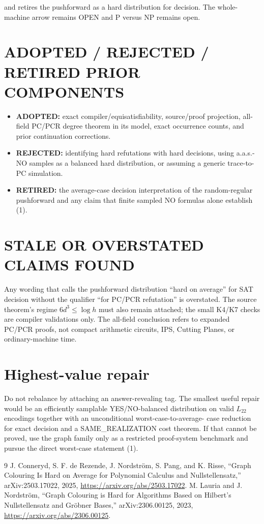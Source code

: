 \documentclass[11pt]{article}
\newcommand{\Ltwo}{L_{22}}
\begin{document}
and retires the pushforward as a hard distribution for decision.  The
whole-machine arrow remains OPEN and P versus NP remains open.

\section{ADOPTED / REJECTED / RETIRED PRIOR COMPONENTS}
\begin{itemize}
\item \textbf{ADOPTED:} exact compiler/equisatisfiability, source/proof
projection, all-field PC/PCR degree theorem in its model, exact occurrence
counts, and prior continuation corrections.
\item \textbf{REJECTED:} identifying hard refutations with hard decisions,
using a.a.s.-NO samples as a balanced hard distribution, or assuming a generic
trace-to-PC simulation.
\item \textbf{RETIRED:} the average-case decision interpretation of the
random-regular pushforward and any claim that finite sampled NO formulas alone
establish (1).
\end{itemize}

\section{STALE OR OVERSTATED CLAIMS FOUND}
Any wording that calls the pushforward distribution ``hard on average'' for
SAT decision without the qualifier ``for PC/PCR refutation'' is overstated.
The source theorem's regime \(6d^3\le\log h\) must also remain attached; the
small K4/K7 checks are compiler validations only.  The all-field conclusion
refers to expanded PC/PCR proofs, not compact arithmetic circuits, IPS,
Cutting Planes, or ordinary-machine time.

\section{Highest-value repair}
Do not rebalance by attaching an answer-revealing tag.  The smallest useful
repair would be an efficiently samplable YES/NO-balanced distribution on
valid \(\Ltwo\) encodings together with an unconditional worst-case-to-average-
case reduction for exact decision and a SAME\_REALIZATION cost theorem.  If
that cannot be proved, use the graph family only as a restricted proof-system
benchmark and pursue the direct worst-case statement (1).

\begin{thebibliography}{9}
J. Conneryd, S. F. de Rezende, J. Nordstr\"om, S. Pang, and K. Risse,
``Graph Colouring Is Hard on Average for Polynomial Calculus and
Nullstellensatz,'' arXiv:2503.17022, 2025,
\url{https://arxiv.org/abs/2503.17022}.
M. Lauria and J. Nordstr\"om,
``Graph Colouring is Hard for Algorithms Based on Hilbert's Nullstellensatz
and Gr\"obner Bases,'' arXiv:2306.00125, 2023,
\url{https://arxiv.org/abs/2306.00125}.
\end{thebibliography}
\end{document}
